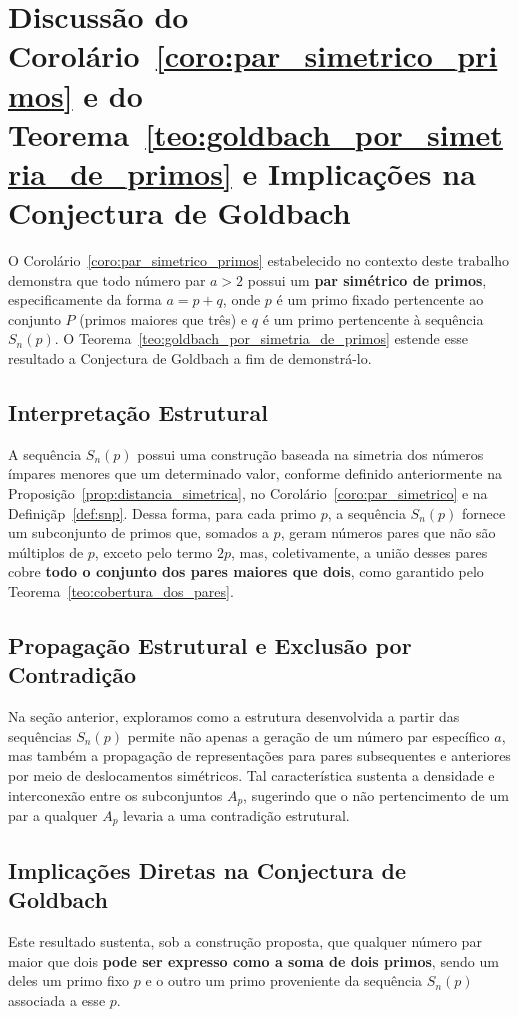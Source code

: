 \documentclass[a4paper,11pt]{article}
\theoremstyle{definition}
\theoremstyle{remark}
\begin{document}
\begin{otherlanguage}{brazil}
	
	\section{Discussão do Corolário~\ref{coro:par_simetrico_primos} e do Teorema~\ref{teo:goldbach_por_simetria_de_primos} e Implicações na Conjectura de Goldbach}
	
	
	O Corolário~\ref{coro:par_simetrico_primos} estabelecido no contexto deste trabalho demonstra que todo número par \(a > 2\) possui um \textbf{par simétrico de primos}, especificamente da forma \(a = p + q\), onde \(p\) é um primo fixado pertencente ao conjunto \(P\) (primos maiores que três) e \(q\) é um primo pertencente à sequência \(S_n(p)\). O Teorema~\ref{teo:goldbach_por_simetria_de_primos} estende esse resultado a Conjectura de Goldbach a fim de demonstrá-lo. 
	
	\subsection{Interpretação Estrutural}
	A sequência \(S_n(p)\) possui uma construção baseada na simetria dos números ímpares menores que um determinado valor, conforme definido anteriormente na Proposição~\ref{prop:distancia_simetrica}, no Corolário~\ref{coro:par_simetrico} e na Definiçãp~\ref{def:snp}. Dessa forma, para cada primo \(p\), a sequência \(S_n(p)\) fornece um subconjunto de primos que, somados a \(p\), geram números pares que não são múltiplos de  \(p\), exceto pelo termo  \(2p\), mas, coletivamente, a união desses pares cobre \textbf{todo o conjunto dos pares maiores que dois}, como garantido pelo Teorema~\ref{teo:cobertura_dos_pares}.
	
	\subsection{Propagação Estrutural e Exclusão por Contradição}
	
	Na seção anterior, exploramos como a estrutura desenvolvida a partir das sequências \(S_n(p)\) permite não apenas a geração de um número par específico \(a\), mas também a propagação de representações para pares subsequentes e anteriores por meio de deslocamentos simétricos. Tal característica sustenta a densidade e interconexão entre os subconjuntos \(A_p\), sugerindo que o não pertencimento de um par a qualquer \(A_p\) levaria a uma contradição estrutural.
	
	\subsection{Implicações Diretas na Conjectura de Goldbach}
	Este resultado sustenta, sob a construção proposta, que qualquer número par maior que dois \textbf{pode ser expresso como a soma de dois primos}, sendo um deles um primo fixo \(p\) e o outro um primo proveniente da sequência \(S_n(p)\) associada a esse \(p\).
	

\end{otherlanguage}
\end{document}
